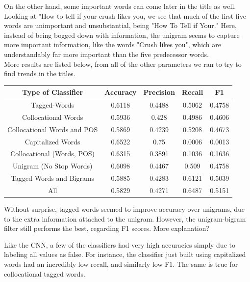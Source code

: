 \documentclass[a4paper,12pt]{article}
\begin{document}
 On the other hand, some important words can come later in the title as well. Looking at "How to tell if your crush likes you, we see that much of the first five words are unimportant and unsubstantial, being "How To Tell if Your." Here, instead of being bogged down with information, the unigram seems to capture more important information, like the words "Crush likes you", which are understandably far more important than the five predecessor words. \\
 
 More results are listed below, from all of the other parameters we ran to try to find trends in the titles.

\begin{center}
 \begin{tabular}{|c| c| c| c| c|} 
 \hline
 Type of Classifier & Accuracy & Precision & Recall & F1 \\ [0.5ex] 
\hline
 Tagged-Words  & 0.6118  & 0.4488  &0.5062  & 0.4758\\ 
 \hline
 Collocational Words & 0.5936  & 0.428  &0.4986  & 0.4606\\
 \hline
Collocational Words and POS & 0.5869& 0.4239 & 0.5208& 0.4673\\
\hline
 Capitalized Words & 0.6522  & 0.75 & 0.0006 & 0.0013\\
 \hline
 Collocational (Words, POS)& 0.6315 & 0.3891 & 0.1036 & 0.1636\\
 \hline
 Unigram (No Stop Words) & 0.6098 & 0.4467 &0.509& 0.4758\\
 \hline
 Tagged Words and Bigrams & 0.5885 & 0.4283 & 0.6121& 0.5039\\
 \hline
 All &0.5829 & 0.4271 & 0.6487 &0.5151\\

 \hline

\end{tabular}
\end{center}

Without surprise, tagged words seemed to improve accuracy over unigrams, due to the extra information attached to the unigram. However, the unigram-bigram filter still performs the best, regarding F1 scores. More explanation?

Like the CNN, a few of the classifiers had very high accuracies simply due to labeling all values as false. For instance, the classifier just built using capitalized words had an incredibly low recall, and similarly low F1. The same is true for collocational tagged words.  
\end{document}
